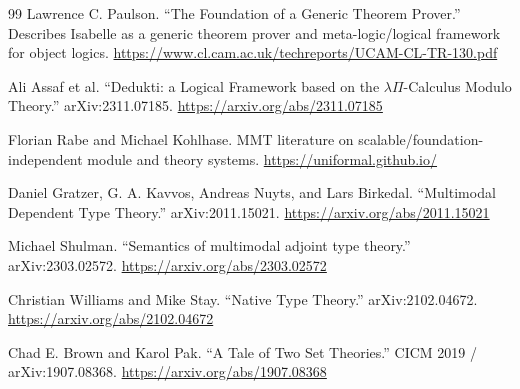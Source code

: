 \documentclass[11pt]{article}
\begin{document}
\begin{thebibliography}{99}
Lawrence C. Paulson.  ``The Foundation of a Generic Theorem Prover.''  Describes Isabelle as a generic theorem prover and meta-logic/logical framework for object logics.  \url{https://www.cl.cam.ac.uk/techreports/UCAM-CL-TR-130.pdf}

Ali Assaf et al.  ``Dedukti: a Logical Framework based on the $\lambda\Pi$-Calculus Modulo Theory.''  arXiv:2311.07185.  \url{https://arxiv.org/abs/2311.07185}

Florian Rabe and Michael Kohlhase.  MMT literature on scalable/foundation-independent module and theory systems.  \url{https://uniformal.github.io/}

Daniel Gratzer, G. A. Kavvos, Andreas Nuyts, and Lars Birkedal.  ``Multimodal Dependent Type Theory.''  arXiv:2011.15021.  \url{https://arxiv.org/abs/2011.15021}

Michael Shulman.  ``Semantics of multimodal adjoint type theory.''  arXiv:2303.02572.  \url{https://arxiv.org/abs/2303.02572}

Christian Williams and Mike Stay.  ``Native Type Theory.''  arXiv:2102.04672.  \url{https://arxiv.org/abs/2102.04672}

Chad E. Brown and Karol Pak.  ``A Tale of Two Set Theories.''  CICM 2019 / arXiv:1907.08368.  \url{https://arxiv.org/abs/1907.08368}

\end{thebibliography}
\end{document}

